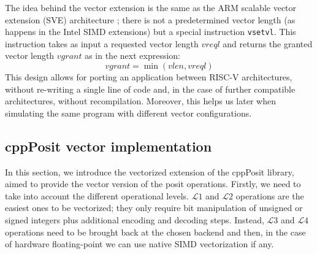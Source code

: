 The idea behind the vector extension is the same as the ARM scalable vector extension (SVE) architecture \cite{armintr}; there is not a predetermined vector length (as happens in the Intel SIMD extensions) but a special instruction \texttt{vsetvl}. This instruction takes as input a requested vector length $vreql$ and returns the granted vector length $vgrant$ as in the next expression:
\begin{equation*} %
    vgrant = \min\left(vlen,vreql\right)
\end{equation*}
This design allows for porting an application between RISC-V architectures, without re-writing a single line of code and, in the case of further compatible architectures, without recompilation. Moreover, this helps us later when simulating the same program with different vector configurations.

\subsection{cppPosit vector implementation}

In this section, we introduce the vectorized extension of the cppPosit library, aimed to provide the vector version of the posit operations. Firstly, we need to take into account the  different operational levels. $\mathcal{L}1$ and $\mathcal{L}2$ operations are the easiest ones to be vectorized; they only require bit manipulation of unsigned or signed integers plus additional encoding and decoding steps. Instead, $\mathcal{L}3$ and $\mathcal{L}4$ operations need to be brought back at the chosen backend and then, in the case of hardware floating-point we can use native SIMD vectorization if any.

